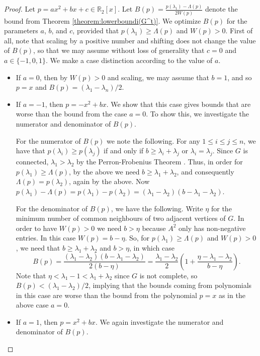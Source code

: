\documentclass[a4paper,11pt]{article}
\theoremstyle{definition}
\def\R{\mathbb R}
\begin{document}
\begin{proof}
    Let $p=ax^2+bx+c \in \R_2[x]$. Let $B(p)=\frac{p(\lambda_1) - \Lambda(p)}{2W(p)}$ denote the bound from Theorem \ref{theorem:lowerboundi(G^t)}. We optimize $B(p)$ for the parameters $a$, $b$, and $c$, provided that $p(\lambda_1)\ge \Lambda(p)$ and $W(p)>0$. First of all, note that scaling by a positive number and shifting does not change the value of $B(p)$, so that we may assume without loss of generality that $c=0$ and $a\in \{-1,0,1\}$. We make a case distinction according to the value of $a$.
    \begin{itemize}
    \item If $a=0$, then by $W(p)>0$ and scaling, we may assume that $b=1$, and so $p=x$ and $B(p)=(\lambda_1-\lambda_n)/2$.
    \item If $a=-1$, then $p=-x^2+bx$. We show that this case gives bounds that are worse than the bound from the case $a=0$. To show this, we investigate the numerator and denominator of $B(p)$.
    
    For the numerator of $B(p)$ we note the following. For any $1\le i\le j\le n$, we have that $p(\lambda_i)\ge p(\lambda_j)$ if and only if $b\ge \lambda_i+\lambda_j$ or $\lambda_i=\lambda_j$. Since $G$ is connected, $\lambda_1>\lambda_2$ by the Perron-Frobenius Theorem \cite{spectra}. Thus, in order for $p(\lambda_1)\ge \Lambda(p)$, by the above we need $b\ge \lambda_1+\lambda_2$, and consequently $\Lambda(p)=p(\lambda_2)$, again by the above. Now $p(\lambda_1)-\Lambda(p)=p(\lambda_1)-p(\lambda_2)=(\lambda_1-\lambda_2)(b-\lambda_1-\lambda_2)$.

    For the denominator of $B(p)$, we have the following. Write $\eta$ for the minimum number of common neighbours of two adjacent vertices of $G$. In order to have $W(p)>0$ we need $b>\eta$ because $A^2$ only has non-negative entries. In this case $W(p)=b-\eta$.
    So, for $p(\lambda_1)\ge \Lambda(p)$ and $W(p)>0$, we need that $b\ge\lambda_1+\lambda_2$ and $b>\eta$, in which case
    $$B(p)=\frac{(\lambda_1-\lambda_2)(b-\lambda_1-\lambda_2)}{2(b-\eta)}=\frac{\lambda_1-\lambda_2}2 \left (1+\frac{\eta-\lambda_1-\lambda_2}{b-\eta} \right).$$
    Note that $\eta < \lambda_1-1 < \lambda_1+\lambda_2$ since $G$ is not complete, so $B(p)< (\lambda_1-\lambda_2)/2$, implying that the bounds coming from polynomials in this case are worse than the bound from the polynomial $p=x$ as in the above case $a=0$.
    
    \item If $a=1$, then $p=x^2+bx$. We again investigate the numerator and denominator of $B(p)$.


\end{itemize}
\end{proof}
\end{document}
